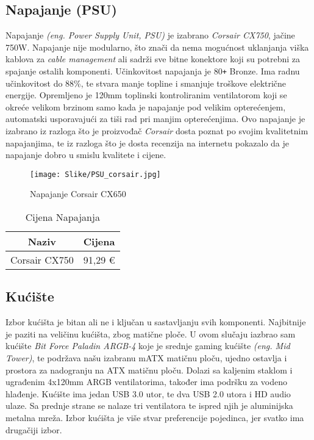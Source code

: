 \documentclass[14pt]{article}
\begin{document}
    \clearpage
    \subsection{Napajanje (PSU)}
    Napajanje \emph{(eng. Power Supply Unit, PSU)} je izabrano \textit{Corsair CX750}, jačine 750W. Napajanje nije modularno, što znači da nema mogućnost uklanjanja viška kablova za \textit{cable management} ali sadrži sve bitne konektore koji su potrebni za spajanje ostalih komponenti. Učinkovitost napajanja je 80\texttt{+} Bronze. Ima radnu učinkovitost do 88\%, te stvara manje topline i smanjuje troškove električne energije. Opremljeno je 120mm toplinski kontroliranim ventilatorom koji se okreće velikom brzinom samo kada je napajanje pod velikim opterećenjem, automatski usporavajući za tiši rad pri manjim opterećenjima. Ovo napajanje je izabrano iz razloga što je proizvođač \textit{Corsair} dosta poznat po svojim kvalitetnim napajanjima, te iz razloga što je dosta recenzija na internetu pokazalo da je napajanje dobro u smislu kvalitete i cijene.

    \begin{figure}[H]
        \centering
        \texttt{[image: Slike/PSU\_corsair.jpg]}
        \caption{Napajanje Corsair CX650}
        \label{fig:Napajanje}
    \end{figure}

    \begin{table}[H]
        \centering
        \begin{tabular}{|c|c|}
            \hline
            Naziv & Cijena \\
            \hline
            Corsair CX750 & 91,29 € \\
            \hline
        \end{tabular}
        \caption{Cijena Napajanja}
        \label{tab:Napajanje}
    \end{table}

    \clearpage
    \subsection{Kućište}
    Izbor kućišta je bitan ali ne i ključan u sastavljanju svih komponenti. Najbitnije je paziti na veličinu kućišta, zbog matične ploče. U ovom slučaju iazbrao sam kućište \textit{Bit Force Paladin ARGB-4} koje je srednje gaming kućište \emph{(eng. Mid Tower)}, te podržava našu izabranu mATX matičnu ploču, ujedno ostavlja i prostora za nadogranju na ATX matičnu ploču. Dolazi sa kaljenim staklom i ugrađenim 4x120mm ARGB ventilatorima, također ima podršku za vodeno hlađenje. Kućište ima jedan USB 3.0 utor, te dva USB 2.0 utora i HD audio ulaze. Sa prednje strane se nalaze tri ventilatora te ispred njih je aluminijska metalna mreža. Izbor kućišta je više stvar preferencije pojedinca, jer svatko ima drugačiji izbor.
\end{document}
